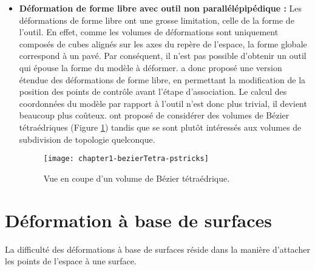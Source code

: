 \begin{itemize}
\item{\textbf{Déformation de forme libre avec outil non parallélépipédique :}}
Les déformations de forme libre ont une grosse limitation, celle de la forme
de l'outil. En effet, comme les volumes de déformations sont uniquement
composés de cubes alignés sur les axes du repère de l'espace, la forme globale
correspond à un pavé. Par conséquent, il n'est pas possible d'obtenir un outil
qui épouse la forme du modèle à déformer. \cite{Coq90} a donc proposé une
version étendue des déformations de forme libre, en permettant la modification
de la position des points de contrôle avant l'étape d'association. Le calcul
des coordonnées du modèle par rapport à l'outil n'est donc plus trivial, il
devient beaucoup plus coûteux. \cite{BBT97} ont proposé de considérer des
volumes de Bézier tétraédriques (Figure \ref{SURTet}) tandis que \cite{MJ96}
se sont plutôt intéressés aux volumes de subdivision de topologie quelconque.

\begin{figure}[ht]
\begin{center}
	\texttt{[image: chapter1-bezierTetra-pstricks]}
  \caption[Volume de Bézier tétraédrique] {Vue en coupe d'un volume de
  Bézier tétraédrique.}
  \label{SURTet}
\end{center}
\end{figure}

\end{itemize}

\section{Déformation à base de surfaces} 

La difficulté des déformations à base de surfaces réside dans la manière
d'attacher les points de l'espace à une surface.

